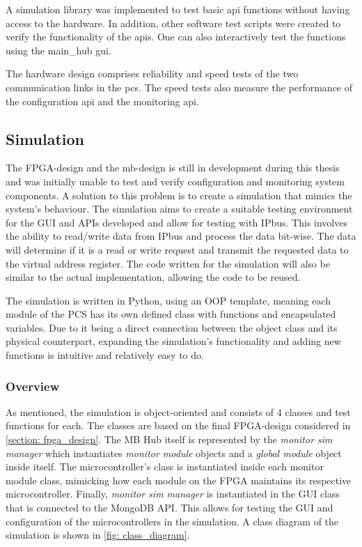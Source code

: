 \documentclass[main.tex]{subfiles}
\begin{document}
A simulation library was implemented to test basic \gls{api} functions without having access to the hardware. In addition, other software test scripts were created to verify the functionality of the \gls{api}s. One can also interactively test the functions using the main\_hub \gls{gui}. 

The hardware design comprises reliability and speed tests of the two communication links in the \gls{pcs}. The speed tests also measure the performance of the configuration \gls{api} and the monitoring \gls{api}.


\subsection{Simulation}

The FPGA-design and the \gls{mb}-design is still in development during this thesis and was initially unable to test and verify configuration and monitoring system components. A solution to this problem is to create a simulation that mimics the system's behaviour. The simulation aims to create a suitable testing environment for the GUI and APIs developed and allow for testing with IPbus. This involves the ability to read/write data from IPbus and process the data bit-wise. The data will determine if it is a read or write request and transmit the requested data to the virtual address register. The code written for the simulation will also be similar to the actual implementation, allowing the code to be reused.

The simulation is written in Python, using an OOP template, meaning each module of the PCS has its own defined class with functions and encapsulated variables. Due to it being a direct connection between the object class and its physical counterpart, expanding the simulation's functionality and adding new functions is intuitive and relatively easy to do.

\subsubsection{Overview}
As mentioned, the simulation is object-oriented and consists of 4 classes and test functions for each. The classes are based on the final FPGA-design considered in \autoref{section: fpga_design}. The MB Hub itself is represented by the \textit{monitor sim manager} which instantiates \textit{monitor module} objects and a \textit{global module} object inside itself. The microcontroller's class is instantiated inside each monitor module class, mimicking how each module on the FPGA maintains its respective microcontroller. Finally, \textit{monitor sim manager} is instantiated in the GUI class that is connected to the MongoDB API. This allows for testing the GUI and configuration of the microcontrollers in the simulation. A class diagram of the simulation is shown in \ref{fig: class_diagram}.
\end{document}
